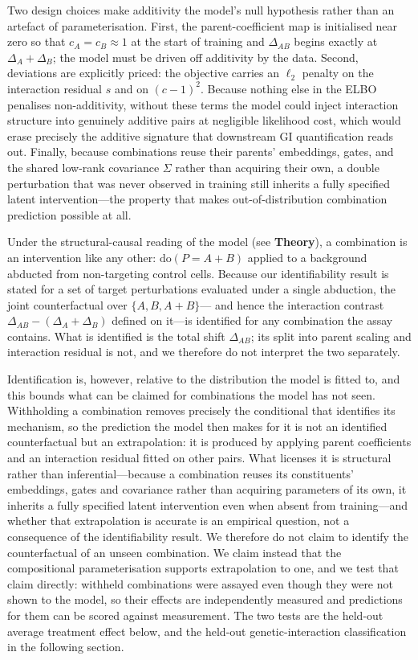 Two design choices make additivity the model's null hypothesis rather than an artefact of
parameterisation. First, the parent-coefficient map is initialised near zero so that
$c_A=c_B\approx 1$ at the start of training and $\Delta_{AB}$ begins exactly at $\Delta_A+\Delta_B$;
the model must be driven off additivity by the data. Second, deviations are explicitly priced: the
objective carries an $\ell_2$ penalty on the interaction residual $s$ and on $(c-1)^2$. Because
nothing else in the ELBO penalises non-additivity, without these terms the model could inject
interaction structure into genuinely additive pairs at negligible likelihood cost, which would erase
precisely the additive signature that downstream GI quantification reads out. Finally, because
combinations reuse their parents' embeddings, gates, and the shared low-rank covariance $\Sigma$
rather than acquiring their own, a double perturbation that was never observed in training still
inherits a fully specified latent intervention---the property that makes out-of-distribution
combination prediction possible at all.

Under the structural-causal reading of the model (see \textbf{Theory}), a combination is an
intervention like any other: $\mathrm{do}(P{=}A{+}B)$ applied to a background abducted from
non-targeting control cells. Because our identifiability result is stated for a set of target
perturbations evaluated under a single abduction, the joint counterfactual over $\{A, B, A{+}B\}$---
and hence the interaction contrast $\Delta_{AB}-(\Delta_A+\Delta_B)$ defined on it---is identified
for any combination the assay contains. What is identified is the total shift $\Delta_{AB}$; its
split into parent scaling and interaction residual is not, and we therefore do not interpret the two
separately.

Identification is, however, relative to the distribution the model is fitted to, and this bounds what
can be claimed for combinations the model has not seen. Withholding a combination removes precisely
the conditional that identifies its mechanism, so the prediction the model then makes for it is not
an identified counterfactual but an extrapolation: it is produced by applying parent coefficients and
an interaction residual fitted on other pairs. What licenses it is structural rather than
inferential---because a combination reuses its constituents' embeddings, gates and covariance rather
than acquiring parameters of its own, it inherits a fully specified latent intervention even when
absent from training---and whether that extrapolation is accurate is an empirical question, not a
consequence of the identifiability result. We therefore do not claim to identify the counterfactual
of an unseen combination. We claim instead that the compositional parameterisation supports
extrapolation to one, and we test that claim directly: withheld combinations were assayed even though
they were not shown to the model, so their effects are independently measured and predictions for
them can be scored against measurement. The two tests are the held-out average treatment effect
below, and the held-out genetic-interaction classification in the following section.

